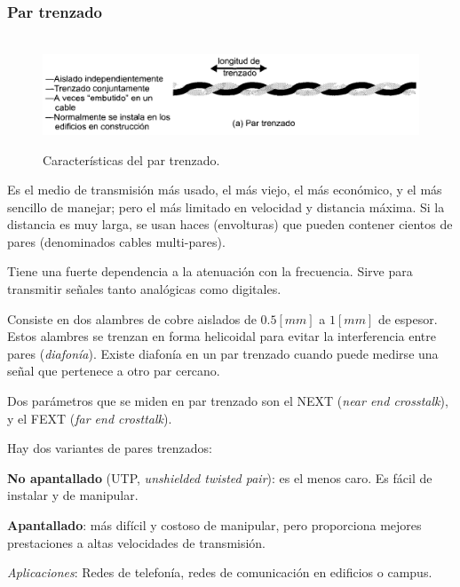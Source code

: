 \documentclass[10pt,a4paper]{article}
\begin{document}
\subsubsection{Par trenzado}

\begin{figure}[ht!]
  \caption{Características del par trenzado.}
  \label{fig:partrenzado}  
  \centering
  \hbox{
	\includegraphics[width=\textwidth-\fboxrule-\fboxrule]{imgs/partrenzado.png}}
\end{figure}

Es el medio de transmisión más usado, el más viejo, el más económico, y el más sencillo de manejar; pero el más limitado en velocidad y distancia máxima. Si la distancia es muy larga, se usan haces (envolturas) que pueden contener cientos de pares (denominados cables multi-pares).

Tiene una fuerte dependencia a la atenuación con la frecuencia. Sirve para transmitir señales tanto analógicas como digitales.

Consiste en dos alambres de cobre aislados de $0.5[mm]$ a $1[mm]$ de espesor. Estos alambres se trenzan en forma helicoidal para evitar la interferencia entre pares (\textit{diafonía}). Existe diafonía en un par trenzado cuando puede medirse una señal que pertenece a otro par cercano. 

Dos parámetros que se miden en par trenzado son el NEXT (\textit{near end crosstalk}), y el FEXT (\textit{far end crosttalk}).

Hay dos variantes de pares trenzados:
\begin{description}
\item \textbf{No apantallado} (UTP, \textit{unshielded twisted pair}): es el menos caro. Es fácil de instalar y de manipular.
\item \textbf{Apantallado}: más difícil y costoso de manipular, pero proporciona mejores prestaciones a altas velocidades de transmisión.
\end{description}

\vspace{10pt}

\textit{Aplicaciones}: Redes de telefonía, redes de comunicación en edificios o campus.
\end{document}
